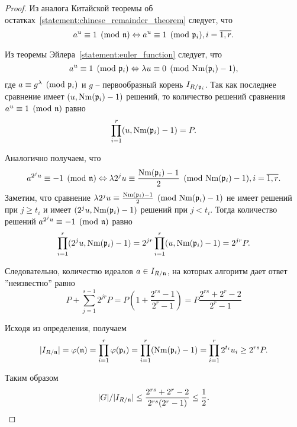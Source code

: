 \documentclass[_00_dissertation.tex]{subfiles}
\begin{document}
\begin{proof}
    Из аналога Китайской теоремы об остатках~\ref{statement:chinese_remainder_theorem} следует, что
    \begin{equation*}
        a^u \equiv 1 \pmod{\mathfrak{n}}
        \Leftrightarrow
        a^u \equiv 1 \pmod{\mathfrak{p}_i}, i=\overline{1, r}.
    \end{equation*}

    Из теоремы Эйлера~\ref{statement:euler_function} следует, что
    \begin{equation*}
        a^u \equiv 1 \pmod{\mathfrak{p}_i}
        \Leftrightarrow
        \lambda u \equiv 0 \pmod{\textrm{Nm}(\mathfrak{p}_i) - 1},
    \end{equation*}
    где $a \equiv g^\lambda \pmod{\mathfrak{p}_i}$ и $g$ -- первообразный корень $I_{R/\mathfrak{p}_i}$.
    Так как последнее сравнение имеет $(u, \textrm{Nm}(\mathfrak{p}_i) - 1)$ решений, то количество решений сравнения $a^u \equiv 1 \pmod{\mathfrak{n}}$ равно
    \begin{equation*}
        \prod_{i=1}^r (u, \textrm{Nm}(\mathfrak{p}_i) - 1) = P.
    \end{equation*}

    Аналогично получаем, что
    \begin{equation*}
        a^{2^j u} \equiv -1 \pmod{\mathfrak{n}}
        \Leftrightarrow
        \lambda 2^j u \equiv \frac{\textrm{Nm}(\mathfrak{p}_i) - 1}{2} \pmod{\textrm{Nm}(\mathfrak{p}_i) - 1}, i=\overline{1, r}.
    \end{equation*}
    Заметим, что сравнение $\lambda 2^j u \equiv \frac{\textrm{Nm}(\mathfrak{p}_i) - 1}{2} \pmod{\textrm{Nm}(\mathfrak{p}_i) - 1}$ не имеет решений при $j \ge t_i$ и имеет $(2^j u, \textrm{Nm}(\mathfrak{p}_i) - 1)$ решений при $j < t_i$.
    Тогда количество решений $a^{2^j u} \equiv -1 \pmod{\mathfrak{n}}$ равно
    \begin{equation*}
        \prod_{i=1}^r (2^j u, \textrm{Nm}(\mathfrak{p}_i) - 1) = 2^{jr} \prod_{i=1}^r (u, \textrm{Nm}(\mathfrak{p}_i) - 1) = 2^{jr} P.
    \end{equation*}

    Следовательно, количество идеалов $a \in I_{R/\mathfrak{n}}$, на которых алгоритм дает ответ ''неизвестно'' равно
    \begin{equation*}
        P + \sum_{j=1}^{s-1} 2^{jr} P = P\left(1 + \frac{2^{rs} - 1}{2^r - 1}\right) = P\frac{2^{rs} + 2^r - 2}{2^r - 1}
    \end{equation*}

    Исходя из определения, получаем
    \begin{equation*}
        |I_{R/\mathfrak{n}}| = \varphi(\mathfrak{n}) = \prod_{i=1}^r \varphi(\mathfrak{p}_i) = \prod_{i=1}^r (\textrm{Nm}(\mathfrak{p}_i) - 1) = \prod_{i=1}^r 2^{t_i} u_i \ge 2^{rs} P.
    \end{equation*}

    Таким образом
    \begin{equation*}
        |G|/|I_{R/\mathfrak{n}}| \le \frac{2^{rs} + 2^r - 2}{2^{rs}(2^r - 1)} \le \frac{1}{2}.
    \end{equation*}
\end{proof}
\end{document}
